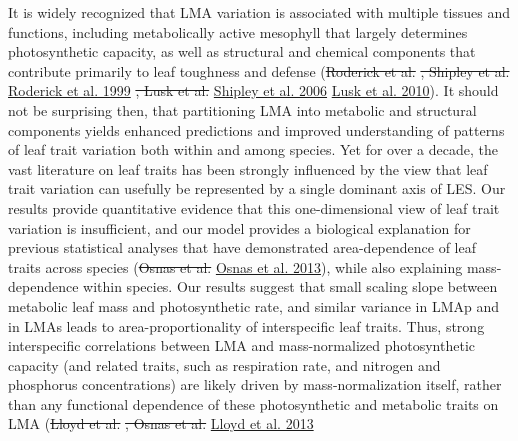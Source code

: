 \documentclass[
  12pt,
]{article}
\providecommand{\DIFaddtex}[1]{{\protect\color{blue}\uwave{#1}}} %
\providecommand{\DIFdeltex}[1]{{\protect\color{red}\sout{#1}}}                      %
\providecommand{\DIFaddbegin}{} %
\providecommand{\DIFaddend}{} %
\providecommand{\DIFdelbegin}{} %
\providecommand{\DIFdelend}{} %
\providecommand{\DIFadd}[1]{\texorpdfstring{\DIFaddtex{#1}}{#1}} %
\providecommand{\DIFdel}[1]{\texorpdfstring{\DIFdeltex{#1}}{}} %
\newcommand{\DIFscaledelfig}{0.5}
\newlength{\DIFdelgraphicswidth} %
\newlength{\DIFdelgraphicsheight} %
\newcommand{\DIFaddincludegraphics}[2][]{{\color{blue}\fbox{\DIFOincludegraphics[#1]{#2}}}} %
\newcommand{\DIFdelincludegraphics}[2][]{%
\sbox{\DIFdelgraphicsbox}{\DIFOincludegraphics[#1]{#2}}%
\settoboxwidth{\DIFdelgraphicswidth}{\DIFdelgraphicsbox} %
\settoboxtotalheight{\DIFdelgraphicsheight}{\DIFdelgraphicsbox} %
\scalebox{\DIFscaledelfig}{%
\parbox[b]{\DIFdelgraphicswidth}{\usebox{\DIFdelgraphicsbox}\\[-\baselineskip] \rule{\DIFdelgraphicswidth}{0em}}\llap{\resizebox{\DIFdelgraphicswidth}{\DIFdelgraphicsheight}{%
\setlength{\unitlength}{\DIFdelgraphicswidth}%
\begin{picture}(1,1)%
\thicklines\linethickness{2pt} %
{\color[rgb]{1,0,0}\put(0,0){\framebox(1,1){}}}%
{\color[rgb]{1,0,0}\put(0,0){\line( 1,1){1}}}%
{\color[rgb]{1,0,0}\put(0,1){\line(1,-1){1}}}%
\end{picture}%
}\hspace*{3pt}}} %
} %
\DeclareRobustCommand{\DIFaddbegin}{\DIFOaddbegin \let\includegraphics\DIFaddincludegraphics} %
\DeclareRobustCommand{\DIFaddend}{\DIFOaddend \let\includegraphics\DIFOincludegraphics} %
\DeclareRobustCommand{\DIFdelbegin}{\DIFOdelbegin \let\includegraphics\DIFdelincludegraphics} %
\DeclareRobustCommand{\DIFdelend}{\DIFOaddend \let\includegraphics\DIFOincludegraphics} %
\begin{document}
It is widely recognized that LMA variation is associated with multiple tissues and functions, including metabolically active mesophyll that largely determines photosynthetic capacity, as well as structural and chemical components that contribute primarily to leaf toughness and defense (\DIFdelbegin \DIFdel{Roderick et al. }\DIFdelend \protect\DIFdelbegin %
\DIFdel{, Shipley et al. }\DIFdelend \DIFaddbegin \hyperlink{ref-Roderick1999}{Roderick et al. 1999}\DIFadd{, }\DIFaddend \protect\DIFdelbegin %
\DIFdel{, Lusk et al. }\DIFdelend \DIFaddbegin \hyperlink{ref-Shipley2006}{Shipley et al. 2006}\DIFadd{, }\DIFaddend \protect\DIFdelbegin %
\DIFdelend \DIFaddbegin \hyperlink{ref-Lusk2010}{Lusk et al. 2010}\DIFaddend ).
It should not be surprising then, that partitioning LMA into metabolic and structural components yields enhanced predictions and improved understanding of patterns of leaf trait variation both within and among species.
Yet for over a decade, the vast literature on leaf traits has been strongly influenced by the view that leaf trait variation can usefully be represented by a single dominant axis of LES.
Our results provide quantitative evidence that this one-dimensional view of leaf trait variation is insufficient, and our model provides a biological explanation for previous statistical analyses that have demonstrated area-dependence of leaf traits across species (\DIFdelbegin \DIFdel{Osnas et al. }\DIFdelend \protect\DIFdelbegin %
\DIFdelend \DIFaddbegin \hyperlink{ref-Osnas2013}{Osnas et al. 2013}\DIFaddend ), while also explaining mass-dependence within species. Our results suggest that small scaling slope between metabolic leaf mass and photosynthetic rate, and similar variance in LMAp and in LMAs leads to area-proportionality of interspecific leaf traits.
Thus, strong interspecific correlations between LMA and mass-normalized photosynthetic capacity (and related traits, such as respiration rate, and nitrogen and phosphorus concentrations) are likely driven by mass-normalization itself, rather than any functional dependence of these photosynthetic and metabolic traits on LMA (\DIFdelbegin \DIFdel{Lloyd et al. }\DIFdelend \protect\DIFdelbegin %
\DIFdel{, Osnas et al. }\DIFdelend \DIFaddbegin \hyperlink{ref-Lloyd2013}{Lloyd et al. 2013}\DIFadd{, }\DIFaddend \protect\DIFdelbegin %
\end{document}

